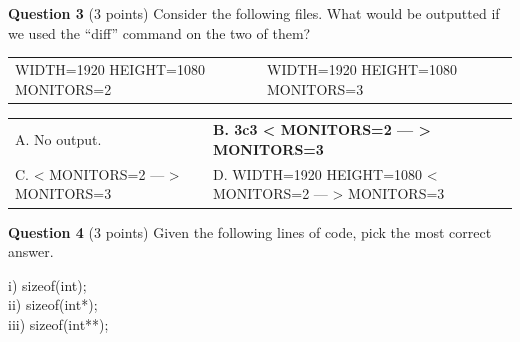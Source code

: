 \documentclass{exam}
\begin{document}
\textbf{Question 3} (3 points) Consider the following files. What would be outputted if we used the “diff” command on the two of them?

\begin{center}
\begin{tabular} { | m{1in} | m{1in} | } 
WIDTH=1920 \newline HEIGHT=1080 \newline MONITORS=2
& 
WIDTH=1920 \newline HEIGHT=1080 \newline MONITORS=3
\end{tabular}
\end{center}

\begin{center}

\begin{tabular} { p{3in}  p{3in} } 
  A.  No output. & \textbf{B. \newline 3c3 \newline < MONITORS=2 \newline --- \newline > MONITORS=3 \newline}\\

  C.  \newline < MONITORS=2 \newline --- \newline > MONITORS=3 & D. \newline WIDTH=1920 \newline HEIGHT=1080 \newline < MONITORS=2 \newline --- \newline > MONITORS=3 \\
\end{tabular}

\end{center}

\vspace{10px}

\textbf{Question 4} (3 points) Given the following lines of code, pick the most correct answer.

\begin{center}
i) sizeof(int);\\
ii) sizeof(int*);\\
iii) sizeof(int**);\\
\end{center}
\end{document}
